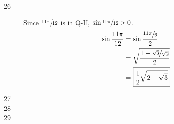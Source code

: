 \documentclass{exam}
\newcommand{\dg}{\ensuremath{^\circ}}
\begin{document}
\begin{description}
      \item[26]
        Since $\sfrac{11 \pi}{12}$ is in Q-II, $\sin \sfrac{11 \pi}{12} > 0$.
        \begin{align*}
          \sin \frac{11 \pi}{12} & = \sin \frac{\sfrac{11 \pi}{6}}{2} \\
                                 & = \sqrt{ \frac{1 - \sfrac{\sqrt{3}}{\sqrt{2}}}{2} } \\
                                 & = \boxed{ \frac{1}{2} \sqrt{ 2 - \sqrt{3} } } \\
        \end{align*}

      \item[27]
        \begin{parts}
          \part 
            \[
              2 \sin 18 \dg \cos 18 \dg = \boxed{ \sin 36 \dg }
            \]

          \part 
            \[
              2 \sin 3 \theta \cos 3 \theta = \boxed{ \sin 6 \theta }
            \]
        \end{parts}

      \item[28]
        \begin{parts}
          \part 
            \[
              \frac{2 \tan 7 \dg}{1 - \tan^2 7 \dg} = \boxed{ \tan 14 \dg }
            \]

          \part 
            \[
              \frac{2 \tan 7 \theta}{1 - \tan^2 7 \theta} = \boxed{ \tan 14 \theta }
            \]
        \end{parts}

      \item[29]
        \begin{parts}
          \part 
            \[
              \cos^2 34 \dg - \sin^2 34 \dg = \boxed{ \cos 68 \dg }
            \]


\end{parts}
\end{description}
\end{document}
